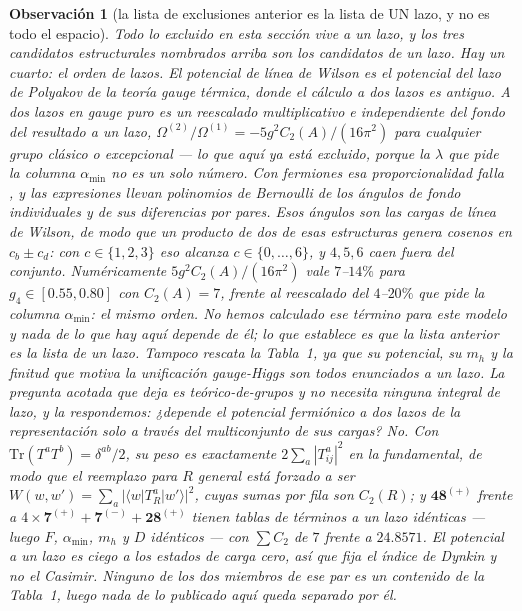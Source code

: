 \documentclass[11pt,a4paper]{article}
\newtheorem{observation}{Observación}
\newcommand{\rep}[1]{\mathbf{#1}}
\newcommand{\amin}{\alpha_{\min}}
\begin{document}
\begin{observation}[la lista de exclusiones anterior es la lista de UN lazo, y no es todo el espacio]
\label{obs:looporder}
Todo lo excluido en esta sección vive a un lazo, y los tres candidatos estructurales nombrados arriba
son los candidatos de un lazo. Hay un cuarto: el \emph{orden de lazos}. El potencial de línea de
Wilson es el potencial del lazo de Polyakov de la teoría gauge térmica, donde el cálculo a dos lazos
es antiguo. A dos lazos en gauge puro es un reescalado multiplicativo e independiente del fondo del
resultado a un lazo, $\Omega^{(2)}/\Omega^{(1)}=-5g^2C_2(A)/(16\pi^2)$ para cualquier grupo clásico o
excepcional \cite{DGKA} --- lo que aquí ya está excluido, porque la $\lambda$ que pide la columna
$\amin$ no es un solo número. Con fermiones esa proporcionalidad falla \cite{GuoDu}, y las
expresiones llevan polinomios de Bernoulli de los ángulos de fondo individuales \emph{y de sus
diferencias por pares}. Esos ángulos son las cargas de línea de Wilson, de modo que un producto de
dos de esas estructuras genera cosenos en $c_b\pm c_d$: con $c\in\{1,2,3\}$ eso alcanza
$c\in\{0,\dots,6\}$, y $4,5,6$ caen fuera del conjunto. Numéricamente $5g^2C_2(A)/(16\pi^2)$ vale
$7$--$14\%$ para $g_4\in[0.55,0.80]$ con $C_2(A)=7$, frente al reescalado del $4$--$20\%$ que pide la
columna $\amin$: \emph{el mismo orden}. No hemos calculado ese término para este modelo y nada de lo
que hay aquí depende de él; lo que establece es que la lista anterior es la lista de un lazo. Tampoco
rescata la Tabla~1, ya que su potencial, su $m_h$ y la finitud que motiva la unificación gauge-Higgs
son todos enunciados a un lazo. La pregunta acotada que deja es teórico-de-grupos y no necesita
ninguna integral de lazo, y la respondemos: \emph{¿depende el potencial fermiónico a dos lazos de la
representación solo a través del multiconjunto de sus cargas?} No. Con
$\mathrm{Tr}(T^aT^b)=\delta^{ab}/2$, su peso es exactamente $2\sum_a|T^a_{ij}|^2$ en la fundamental,
de modo que el reemplazo para $R$ general está forzado a ser
$W(w,w')=\sum_a|\langle w|T^a_R|w'\rangle|^2$, cuyas sumas por fila son $C_2(R)$; y
$\rep{48}^{(+)}$ frente a $4\times\rep7^{(+)}+\rep7^{(-)}+\rep{28}^{(+)}$ tienen tablas de términos a
un lazo idénticas --- luego $F$, $\amin$, $m_h$ y $D$ idénticos --- con $\sum C_2$ de $7$ frente a
$24.8571$. El potencial a un lazo es ciego a los estados de carga cero, así que fija el índice de
Dynkin y no el Casimir. Ninguno de los dos miembros de ese par es un contenido de la Tabla~1, luego
nada de lo publicado aquí queda separado por él.
\end{observation}
\end{document}
